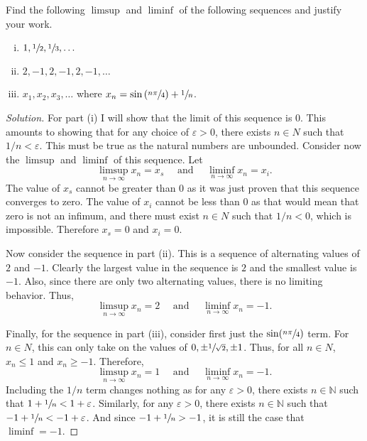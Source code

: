 \documentclass[11pt,letterpaper]{article}
\newcommand{\N}{\mathbb{N}}
\newcommand{\eps}{\varepsilon}
\renewcommand{\epsilon}{\eps}
\newenvironment{prob}[1]
  {\renewcommand\theinnerprob{#1}\innerprob}
  {\endinnerprob}
\newenvironment{solution}
  {\renewcommand\qedsymbol{}\begin{proof}[Solution]}
  {\end{proof}\bigskip}
\begin{document}
\begin{prob}{1}  %
Find the following $\limsup$ and $\liminf$ of the following sequences and justify your work.
\begin{enumerate}[(i)]
	\item $1,\sfrac{1}{2}, \sfrac{1}{3}, \dots$
	\item $2,-1,2,-1,2,-1,\dots$
	\item $x_1, x_2, x_3,\dots$ where $x_n = \sin\left(\sfrac{n\pi}{4}\right) + \sfrac{1}{n}$.
\end{enumerate}
\end{prob}
\begin{solution}
	For part (i) I will show that the limit of this sequence is $0$. This amounts to showing that  for any choice of $\epsilon > 0$, there exists $n\in N$ such that $1/n < \epsilon$. This must be true as the natural numbers are unbounded. Consider now the $\limsup$ and $\liminf$ of this sequence. Let $$\limsup_{n\to\infty} x_n = x_s \quad \text{ and } \quad \liminf_{n\to\infty} x_n = x_i.$$ The value of $x_s$ cannot be greater than $0$ as it was just proven that this sequence converges to zero. The value of $x_i$ cannot be less than $0$ as that would mean that zero is not an infimum, and there must exist $n\in N$ such that $1/n < 0$, which is impossible. Therefore $x_s = 0$ and $x_i = 0$.
	
	Now consider the sequence in part (ii). This is a sequence of alternating values of $2$ and $-1$. Clearly the largest value in the sequence is $2$ and the smallest value is $-1$. Also, since there are only two alternating values, there is no limiting behavior. Thus, $$\limsup_{n\to\infty} x_n = 2 \quad \text{ and } \quad \liminf_{n\to\infty} x_n = -1.$$
	
	Finally, for the sequence in part (iii), consider first just the $\sin(\sfrac{n\pi}{4})$ term. For $n\in N$, this can only take on the values of $0, \pm \sfrac{1}{\sqrt 2}, \pm 1$. Thus, for all $n\in N$, $x_n \leq 1$ and $x_n \geq -1$. Therefore, $$\limsup_{n\to\infty} x_n = 1 \quad \text{ and } \quad \liminf_{n\to\infty} x_n = -1.$$ Including the $1/n$ term changes nothing as for any $\epsilon > 0$, there exists $n\in \N$ such that $1 + \sfrac{1}{n} < 1 + \epsilon$. Similarly, for any $\epsilon > 0$, there exists $n\in \N$ such that $-1 + \sfrac{1}{n} < -1 + \epsilon$. And since $-1 + \sfrac{1}{n} > -1$, it is still the case that $\liminf = -1$. 
\end{solution}
\newpage
\end{document}
